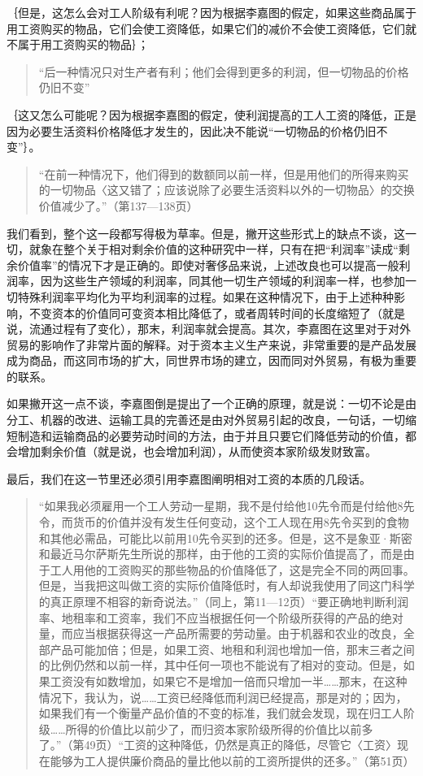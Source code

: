 ｛但是，这怎么会对工人阶级有利呢？因为根据李嘉图的假定，如果这些商品属于用工资购买的物品，它们会使工资降低，如果它们的减价不会使工资降低，它们就不属于用工资购买的物品｝；

\begin{quote}{“后一种情况只对生产者有利；他们会得到更多的利润，但一切物品的价格仍旧不变”}\end{quote}

｛这又怎么可能呢？因为根据李嘉图的假定，使利润提高的工人工资的降低，正是因为必要生活资料价格降低才发生的，因此决不能说“一切物品的价格仍旧不变”｝。

\begin{quote}{“在前一种情况下，他们得到的数额同以前一样，但是用他们的所得来购买的一切物品〈这又错了；应该说除了必要生活资料以外的一切物品〉的交换价值减少了。”（第137—138页）}\end{quote}

我们看到，整个这一段都写得极为草率。但是，撇开这些形式上的缺点不谈，这一切，就象在整个关于相对剩余价值的这种研究中一样，只有在把“利润率”读成“剩余价值率”的情况下才是正确的。即使对奢侈品来说，上述改良也可以提高一般利润率，因为这些生产领域的利润率，同其他一切生产领域的利润率一样，也参加一切特殊利润率平均化为平均利润率的过程。如果在这种情况下，由于上述种种影响，不变资本的价值同可变资本相比降低了，或者周转时间的长度缩短了（就是说，流通过程有了变化），那末，利润率就会提高。其次，李嘉图在这里对于对外贸易的影响作了非常片面的解释。对于资本主义生产来说，非常重要的是产品发展成为商品，而这同市场的扩大，同世界市场的建立，因而同对外贸易，有极为重要的联系。

如果撇开这一点不谈，李嘉图倒是提出了一个正确的原理，就是说：一切不论是由分工、机器的改进、运输工具的完善还是由对外贸易引起的改良，一句话，一切缩短制造和运输商品的必要劳动时间的方法，由于并且只要它们降低劳动的价值，都会增加剩余价值（就是说，也会增加利润），从而使资本家阶级发财致富。

最后，我们在这一节里还必须引用李嘉图阐明相对工资的本质的几段话。

\begin{quote}{“如果我必须雇用一个工人劳动一星期，我不是付给他10先令而是付给他8先令，而货币的价值并没有发生任何变动，这个工人现在用8先令买到的食物和其他必需品，可能比以前用10先令买到的还多。但是，这不是象亚·斯密和最近马尔萨斯先生所说的那样，由于他的工资的实际价值提高了，而是由于工人用他的工资购买的那些物品的价值降低了，这是完全不同的两回事。但是，当我把这叫做工资的实际价值降低时，有人却说我使用了同这门科学的真正原理不相容的新奇说法。”（同上，第11—12页）“要正确地判断利润率、地租率和工资率，我们不应当根据任何一个阶级所获得的产品的绝对量，而应当根据获得这一产品所需要的劳动量。由于机器和农业的改良，全部产品可能加倍；但是，如果工资、地租和利润也增加一倍，那末三者之间的比例仍然和以前一样，其中任何一项也不能说有了相对的变动。但是，如果工资没有如数增加，如果它不是增加一倍而只增加一半……那末，在这种情况下，我认为，说……工资已经降低而利润已经提高，那是对的；因为，如果我们有一个衡量产品价值的不变的标准，我们就会发现，现在归工人阶级……所得的价值比以前少了，而归资本家阶级所得的价值比以前多了。”（第49页）“工资的这种降低，仍然是真正的降低，尽管它〈工资〉现在能够为工人提供廉价商品的量比他以前的工资所提供的还多。”（第51页）}\end{quote}

